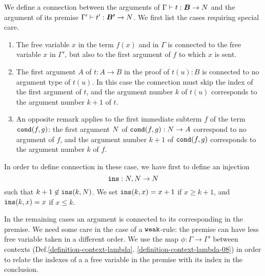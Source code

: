 %
%


We define a connection between the arguments of $\Gamma \vdash t:\vec{B} 
\rightarrow \N$ and the argument of its premise $\Gamma' \vdash t':\vec{B'} 
\rightarrow \N$. We first list the cases requiring special care.
\begin{enumerate}
\item
The free variable $x$ in the term $f(x)$ and in 
$\Gamma$ is connected to the free variable $x$ in $\Gamma'$, but also to the first 
argument of $f$ to which $x$ is sent.
\item
The first argument $A$ of $t:A \rightarrow B$ in the proof of $t(u):B$ is connected to no argument type of $t(u)$.
In this case the connection must skip the index of the first argument of $t$,
and the argument number $k$ of $t(u)$ corresponds to the argument number 
$k+1$ of $t$. 
\item
An opposite remark applies to the first immediate subterm $f$ of the
term ${\tt cond}(f,g)$:  the first argument ${N}$ of ${\tt cond}(f,g):{N} \rightarrow A$
correspond to no argument of $f$, and the argument number $k+1$ of 
${\tt cond}(f,g)$ corresponds to the argument number $k$ of $f$. 
\end{enumerate}
In order to define connection in these case, we have first to define an injection 
\[
{\tt ins}:{N},{N} \rightarrow{N}
\]
such that $k+1 \not \in {\tt ins}(k,{N})$. We set ${\tt ins}(k,x)=x+1$ if $x \ge k+1$, and 
${\tt ins}(k,x)=x$ if $x\le k$. 

In the remaining cases an argument is connected to its corresponding in the 
premise. We need some care in the case of a ${\tt weak}$-rule: the premise can
have less free variable taken in a different order. We use the map $\phi:\Gamma 
\rightarrow \Gamma'$ between contexts (Def.\ref{definition-context-lambda}.
\ref{definition-context-lambda-08}) in order to relate the indexes of a a free 
variable in the premise with its index in the conclusion. 

